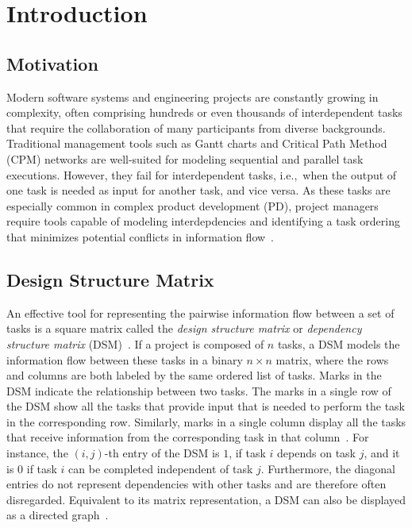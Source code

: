 \documentclass[12pt]{article}
\theoremstyle{definition}
\begin{document}
\newpage

\tableofcontents
\newpage



\section{Introduction}\label{sec:intro}

\subsection{Motivation}

Modern software systems and engineering projects are constantly growing in complexity, often comprising hundreds or even thousands of interdependent tasks that require the collaboration of many participants from diverse backgrounds. Traditional management tools such as Gantt charts and Critical Path Method (CPM) networks are well-suited for modeling sequential and parallel task executions. However, they fail for interdependent tasks, i.e.,~when the output of one task is needed as input for another task, and vice versa. As these tasks are especially common in complex product development (PD), project managers require tools capable of modeling interdepdencies and identifying a task ordering that minimizes potential conflicts in information flow~\cite{Yassine2001AnIT}.

\subsection{Design Structure Matrix}

An effective tool for representing the pairwise information flow between a set of tasks is a square matrix called the \textit{design structure matrix} or \textit{dependency structure matrix} (DSM)~\cite{hossain_projectdescription}. If a project is composed of $n$ tasks, a DSM models the information flow between these tasks in a binary $n \times n$ matrix, where the rows and columns are both labeled by the same ordered list of tasks. Marks in the DSM indicate the relationship between two tasks. The marks in a single row of the DSM show all the tasks that provide input that is needed to perform the task in the corresponding row. Similarly, marks in a single column display all the tasks that receive information from the corresponding task in that column~\cite{Yassine2001AnIT}. For instance, the $(i,j)$-th entry of the DSM is $1$, if task $i$ depends on task $j$, and it is $0$ if task $i$ can be completed independent of task $j$. Furthermore, the diagonal entries do not represent dependencies with other tasks and are therefore often disregarded. Equivalent to its matrix representation, a DSM can also be displayed as a directed graph~\cite{eppinger2012}.
\end{document}
